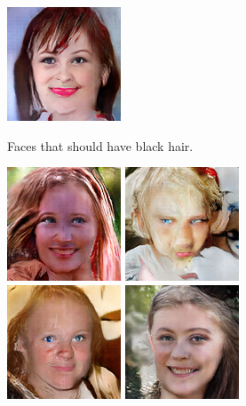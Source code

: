 \begin{figure}[!h]
\begin{subfigure}[b]{\textwidth}
{            \includegraphics[scale=0.485]{figures/ffhq/forced-hair-black/ffhq128x128_hair_color_black0005.png}
        }
        \caption{Faces that should have black hair.}
        \vspace{0.1cm}
    \end{subfigure}
    \begin{subfigure}[b]{\textwidth}
        \centerline{
            \includegraphics[scale=0.485]{figures/ffhq/forced-hair-brown/ffhq128x128_hair_color_brown0000.png}
            \includegraphics[scale=0.485]{figures/ffhq/forced-hair-brown/ffhq128x128_hair_color_brown0001.png}
            \includegraphics[scale=0.485]{figures/ffhq/forced-hair-brown/ffhq128x128_hair_color_brown0002.png}
            \includegraphics[scale=0.485]{figures/ffhq/forced-hair-brown/ffhq128x128_hair_color_brown0003.png}
}
\end{subfigure}
\end{figure}
